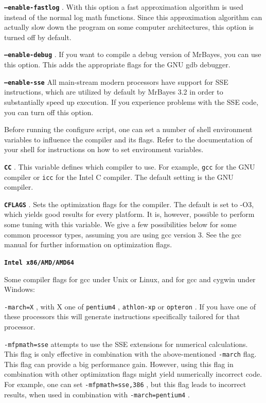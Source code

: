 \documentclass[12pt]{book}
\newcommand{\ttt}[1]{\texttt{#1} }
\newcommand{\tb}[1]{\texttt{\textbf{#1}} }
\begin{document}
\tb{--enable-fastlog}. With this option a fast approximation algorithm is used instead of the
normal log  math functions. Since this approximation algorithm can actually slow down the program
on some computer architectures, this option is turned off by default. 

\tb{--enable-debug}. If you want to compile a debug version of MrBayes, you can use this option.
This adds the appropriate flags for the GNU gdb debugger. 

\tb{--enable-sse}    All main-stream modern processors have support for SSE instructions, which are
utilized by default by MrBayes 3.2 in order to substantially speed up execution. If you experience
problems with the SSE code, you can turn off this option.

Before running the configure script, one can set a number of shell environment variables to
influence the compiler and its flags. Refer to the documentation of your shell for instructions on
how to set environment variables.

\tb{CC}. This variable defines which compiler to use. For example, \ttt{gcc} for the GNU compiler
or \ttt{icc} for the Intel C compiler. The default setting is the GNU compiler.

\tb{CFLAGS}. Sets the optimization flags for the compiler. The default is set to -O3, which yields
good results for every platform. It is, however, possible to perform some tuning with this
variable. We give a few possibilities below for some common processor types, assuming you are using
gcc version 3. See the gcc manual for further information on optimization flags.

\tb{{Intel x86/AMD/AMD64}} 

Some compiler flags for gcc under Unix or Linux, and for gcc and cygwin under Windows:

\ttt{-march=X}, with X one of \ttt{pentium4}, \ttt{athlon-xp} or \ttt{opteron}.  If you have one of
these processors this will generate instructions specifically tailored for that processor.

\ttt{-mfpmath=sse} attempts to use the SSE extensions for numerical calculations. This flag is only
effective in combination with the above-mentioned \ttt{-march} flag. This flag can provide a big
performance gain. However, using this flag in combination with other optimization flags might yield
numerically incorrect code. For example, one can set \ttt{-mfpmath=sse,386}, but this flag leads to
incorrect results, when used in combination with \ttt{-march=pentium4}. 
 
\end{document}
